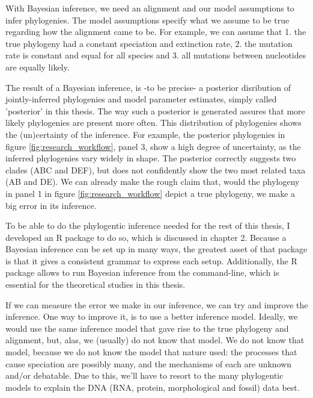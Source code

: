 
With Bayesian inference, we need an alignment and our model assumptions to
infer phylogenies.
The model assumptions specify what we assume to be true regarding how
the alignment came to be. For example, we can assume that 1. the true
phylogeny had a constant speciation and extinction rate, 2. the
mutation rate is constant and equal for all species and 3. all
mutations between nucleotides are equally likely. 

The result of a Bayesian inference, is -to be precise- a posterior
disribution of jointly-inferred phylogenies and model parameter estimates,
simply called 'posterior' in this thesis.
The way such a posterior is generated assures that more likely phylogenies 
are present more often. 
This distribution of phylogenies shows the
(un)certainty of the inference.
For example, the posterior phylogenies in figure \ref{fig:research_workflow},
panel 3, show a high degree of uncertainty, as the
inferred phylogenies vary widely in shape. The posterior correctly
suggests two clades (ABC and DEF), but does not confidently show
the two most related taxa (AB and DE). We can already make 
the rough claim that, would the phylogeny in panel 1 
in figure \ref{fig:research_workflow} depict
a true phylogeny, we make a big error in its inference.

To be able to do the phylogentic inference needed for the rest of this
thesis, I developed an R package to do so, which
is discussed in chapter 2. Because a Bayesian inference can be set up in
many ways, the greatest asset of that package is that it gives a
consistent grammar to express each setup. Additionally, the R package allows
to run Bayesian inference from the command-line, which is essential for
the theoretical studies in this thesis.

If we can measure the error we make in our inference, 
we can try and improve the inference. 
One way to improve it, is to use a better inference model.
Ideally, we would use the same inference model that gave rise to
the true phylogeny and alignment, but, alas, 
we (usually) do not know that model.
We do not know that model, because we do not know the
model that nature used: the
processes that cause speciation are possibly many, and 
the mechanisms of each are unknown and/or debatable.
Due to this, we'll have to resort to the many phylogentic models 
to explain the DNA (RNA, protein, morphological and fossil) data best.

